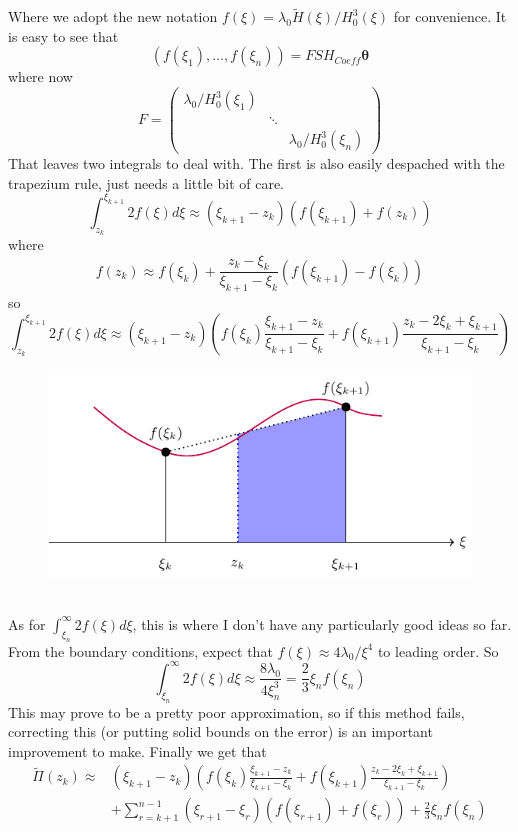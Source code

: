 \documentclass{article}
\newcommand{\bs}{\boldsymbol}                               %
\begin{document}
Where we adopt the new notation $f(\xi) = \lambda_0 \tilde{H}(\xi)/H_0^3(\xi)$
for convenience. It is easy to see that 
\[ (f(\xi_1), \dots , f(\xi_n)) = FSH_{Coeff}\bs{\theta} \] 
where now 
\[ F = \left( \begin{array}{ccc}
\lambda_0/H_0^3(\xi_1) \\
& \ddots \\
& & \lambda_0/H_0^3(\xi_n) \end{array} \right) \]
That leaves two integrals to deal with. The first is also easily despached
with the trapezium rule, just needs a little bit of care.
\[ \int_{z_k}^{\xi_{k+1}} 2f(\xi) d\xi \approx (\xi_{k+1} - z_k)(f(\xi_{k+1})
+ f(z_k) )\]
where
\[f(z_k) \approx f(\xi_k) + \frac{z_k - \xi_k}{\xi_{k+1}-\xi_k} (f(\xi_{k+1})
-f(\xi_k) ) \] 
so
\[ \int_{z_k}^{\xi_{k+1}} 2f(\xi) d\xi \approx (\xi_{k+1} - z_k)
\left( f(\xi_k) \frac{\xi_{k+1}-z_k}{\xi_{k+1}-\xi_k} + f(\xi_{k+1})
\frac{z_k - 2 \xi_k +\xi_{k+1}}{\xi_{k+1}-\xi_k} \right)
\]
\begin{figure}[!ht]\centering
\includegraphics{LinFig1.pdf}
\end{figure}
\\
As for $ \int_{\xi_n}^{\infty} 2f(\xi) d\xi$, this is where I don't have any
particularly good ideas so far. From the boundary conditions, expect that
$f(\xi) \approx 4\lambda_0 /\xi^4$ to leading order. So
\[ \int_{\xi_n}^{\infty} 2f(\xi) d\xi \approx \frac{8\lambda_0}{4\xi_n^3}
= \frac{2}{3} \xi_n f(\xi_n)\]
This may prove to be a pretty poor approximation, so if this method fails, 
correcting this (or putting solid bounds on the error) is an important 
improvement to make. Finally we get that
\begin{align*}
\tilde{\Pi}(z_k) \approx &(\xi_{k+1} - z_k)
\left( f(\xi_k) \frac{\xi_{k+1}-z_k}{\xi_{k+1}-\xi_k} + f(\xi_{k+1})
\frac{z_k - 2 \xi_k +\xi_{k+1}}{\xi_{k+1}-\xi_k} \right) \\
&+ \sum_{r = k+1}^{n-1} (\xi_{r+1} - \xi_{r})(f(\xi_{r+1})+f(\xi_r)) + 
\frac{2}{3}\xi_n f(\xi_n)
\end{align*}
\end{document}
